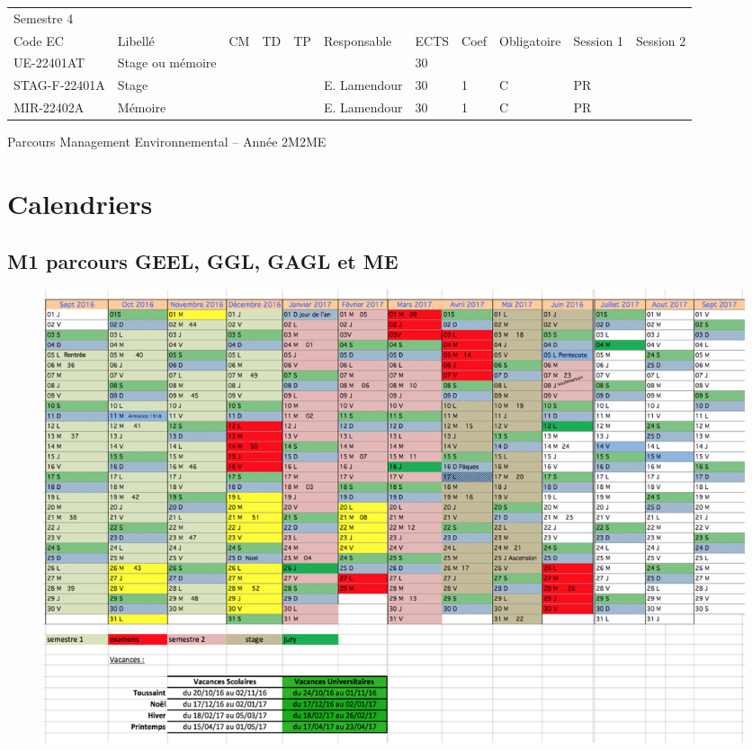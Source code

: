 \documentclass[a4paper,11pt]{article}
\begin{document}
{{\begin{tabular}{lllllllllll}
\rowcolor[HTML]{656565} 
Semestre 4    &                                                                   &    &    &    &                 &      &      &             &                &           \\
\rowcolor[HTML]{9B9B9B} 
Code EC       & Libellé                                                           & CM & TD & TP & Responsable     & ECTS & Coef & Obligatoire & Session 1      & Session 2 \\
\rowcolor[HTML]{C0C0C0} 
UE-22401AT    & Stage ou mémoire                                                  &    &    &    &                 & 30   &      &             &                &           \\
STAG-F-22401A & Stage                                                             &    &    &    & E. Lamendour    & 30   & 1    & C           & PR             &           \\
MIR-22402A    & Mémoire                                                           &    &    &    & E. Lamendour    & 30   & 1    & C           & PR             &          
\end{tabular}}
}{Parcours Management Environnemental -- Année 2}{M2ME}



\section{Calendriers}\label{Calendrier}

\subsection{M1 parcours GEEL, GGL, GAGL et ME}
\begin{figure}[H]
	\centering
		\includegraphics[width=1.4\textwidth, angle=90]{Calendriers/calendrierM1.png}
	\label{calM1}
\end{figure}
\end{document}
